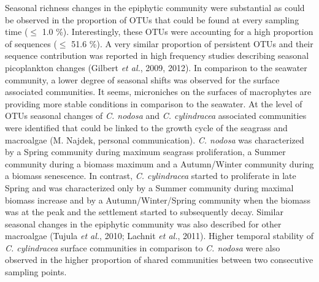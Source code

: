 \documentclass[12pt,]{article}
\begin{document}
Seasonal richness changes in the epiphytic community were substantial as
could be observed in the proportion of OTUs that could be found at every
sampling time (\(\leq\) 1.0 \si{\percent}). Interestingly, these OTUs
were accounting for a high proportion of sequences (\(\leq\) 51.6
\si{\percent}). A very similar proportion of persistent OTUs and their
sequence contribution was reported in high frequency studies describing
seasonal picoplankton changes (Gilbert \emph{et al.}, 2009, 2012). In
comparison to the seawater community, a lower degree of seasonal shifts
was observed for the surface associated communities. It seems,
microniches on the surfaces of macrophytes are providing more stable
conditions in comparison to the seawater. At the level of OTUs seasonal
changes of \emph{C. nodosa} and \emph{C. cylindracea} associated
communities were identified that could be linked to the growth cycle of
the seagrass and macroalgae (M. Najdek, personal communication).
\emph{C. nodosa} was characterized by a Spring community during maximum
seagrass proliferation, a Summer community during a biomass maximum and
a Autumn/Winter community during a biomass senescence. In contrast,
\emph{C. cylindracea} started to proliferate in late Spring and was
characterized only by a Summer community during maximal biomass increase
and by a Autumn/Winter/Spring community when the biomass was at the peak
and the settlement started to subsequently decay. Similar seasonal
changes in the epiphytic community was also described for other
macroalgae (Tujula \emph{et al.}, 2010; Lachnit \emph{et al.}, 2011).
Higher temporal stability of \emph{C. cylindracea} surface communities
in comparison to \emph{C. nodosa} were also observed in the higher
proportion of shared communities between two consecutive sampling
points.
\end{document}

